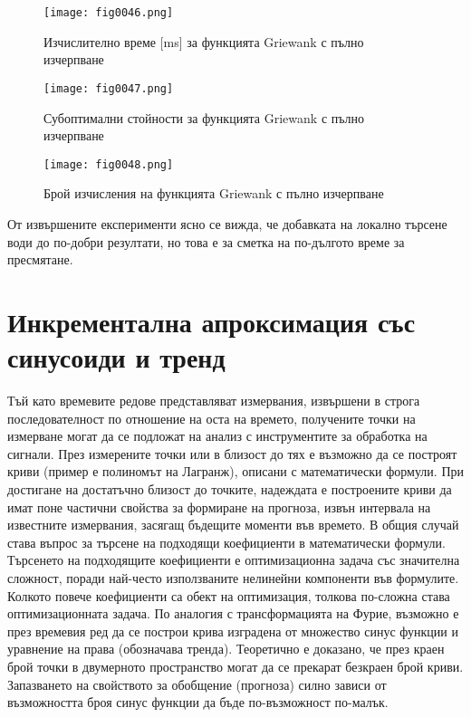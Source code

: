 \begin{figure}[H]
  \centering
  \texttt{[image: fig0046.png]}
  \caption{Изчислително време [ms] за функцията Griewank с пълно изчерпване}
\label{fig0046}
\end{figure}

\begin{figure}[H]
  \centering
  \texttt{[image: fig0047.png]}
  \caption{Субоптимални стойности за функцията Griewank с пълно изчерпване}
\label{fig0047}
\end{figure}

\begin{figure}[H]
  \centering
  \texttt{[image: fig0048.png]}
  \caption{Брой изчисления на функцията Griewank с пълно изчерпване}
\label{fig0048}
\end{figure}

От извършените експерименти ясно се вижда, че добавката на локално търсене води до по-добри резултати, но това е за сметка на по-дългото време за пресмятане.

\section{Инкрементална апроксимация със синусоиди и тренд}

Тъй като времевите редове представляват измервания, извършени в строга последователност по отношение на оста на времето, получените точки на измерване могат да се подложат на анализ с инструментите за обработка на сигнали. През измерените точки или в близост до тях е възможно да се построят криви (пример е полиномът на Лагранж), описани с математически формули. При достигане на достатъчно близост до точките, надеждата е построените криви да имат поне частични свойства за формиране на прогноза, извън интервала на известните измервания, засягащ бъдещите моменти във времето. В общия случай става въпрос за търсене на подходящи коефициенти в математически формули. Търсенето на подходящите коефициенти е оптимизационна задача със значителна сложност, поради най-често използваните нелинейни компоненти във формулите. Колкото повече коефициенти са обект на оптимизация, толкова по-сложна става оптимизационната задача. По аналогия с трансформацията на Фурие, възможно е през времевия ред да се построи крива изградена от множество синус функции и уравнение на права (обозначава тренда). Теоретично е доказано, че през краен брой точки в двумерното пространство могат да се прекарат безкраен брой криви. Запазването на свойството за обобщение (прогноза) силно зависи от възможността броя синус функции да бъде по-възможност по-малък. 

